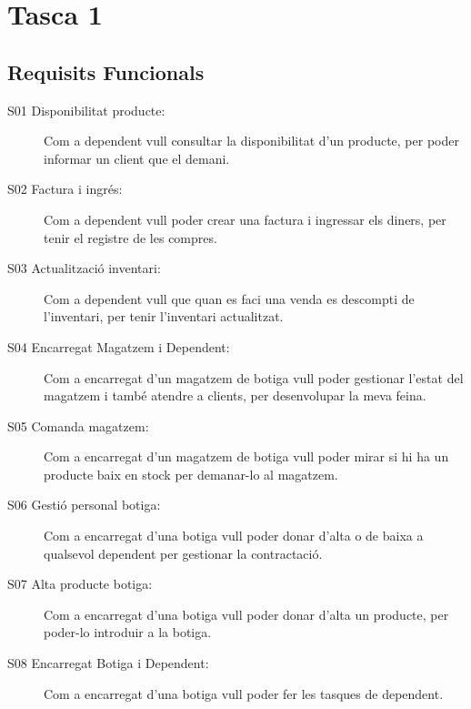 \documentclass[a4paper,12pt]{article}
\begin{document}

\tableofcontents
\newpage

\section{Tasca 1}
\subsection{Requisits Funcionals}

\begin{description}
	\item[S01 Disponibilitat producte:] Com a dependent vull consultar la disponibilitat d'un producte, per poder informar un client que el demani.
	\item[S02 Factura i ingrés:] Com a dependent vull poder crear una factura i ingressar els diners, per tenir el registre de les compres.
	\item[S03 Actualització inventari:] Com a dependent vull que quan es faci una venda es descompti de l'inventari, per tenir l'inventari actualitzat.
\end{description}


\begin{description}
	\item[S04 Encarregat Magatzem i Dependent:] Com a encarregat d'un magatzem de botiga vull poder gestionar l'estat del magatzem i també atendre a clients, per desenvolupar la meva feina.
	\item[S05 Comanda magatzem:] Com a encarregat d'un magatzem de botiga vull poder mirar si hi ha un producte baix en stock per demanar-lo al magatzem.
\end{description}

\begin{description}
	\item[S06 Gestió personal botiga:] Com a encarregat d'una botiga vull poder donar d'alta o de baixa a qualsevol dependent per gestionar la contractació.
    \item[S07 Alta producte botiga:] Com a encarregat d'una botiga vull poder donar d'alta un producte, per poder-lo introduir a la botiga.
    \item[S08 Encarregat Botiga i Dependent:] Com a encarregat d'una botiga vull poder fer les tasques de dependent.
\end{description}
\end{document}
